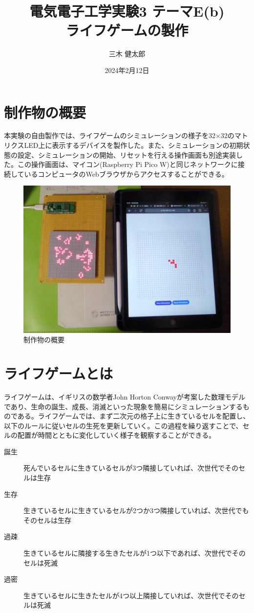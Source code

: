 \documentclass{jlreq}
\title{電気電子工学実験3 テーマE(b) \\ ライフゲームの製作}
\author{三木 健太郎}
\date{2024年2月12日}
\begin{document}
\maketitle

\section{制作物の概要}
本実験の自由製作では、ライフゲームのシミュレーションの様子を32×32のマトリクスLED上に表示するデバイスを製作した。また、シミュレーションの初期状態の設定、シミュレーションの開始、リセットを行える操作画面も別途実装した。この操作画面は、マイコン(Raspberry Pi Pico W)と同じネットワークに接続しているコンピュータのWebブラウザからアクセスすることができる。

\begin{figure}[h]
    \begin{center}
        \includegraphics[width=120mm]{img/life-game-indicator.jpg}
    \end{center}
    \caption{制作物の概要}
    \label{img:overall}
\end{figure}

\section{ライフゲームとは}
ライフゲームは、イギリスの数学者John Horton Conwayが考案した数理モデルであり、生命の誕生、成長、消滅といった現象を簡易にシミュレーションするものである。ライフゲームでは、まず二次元の格子上に生きているセルを配置し、以下のルールに従いセルの生死を更新していく。この過程を繰り返すことで、セルの配置が時間とともに変化していく様子を観察することができる。

\begin{description}
    \item[誕生] 死んでいるセルに生きているセルが3つ隣接していれば、次世代でそのセルは生存
    \item[生存] 生きているセルに生きているセルが2つか3つ隣接していれば、次世代でもそのセルは生存
    \item[過疎] 生きているセルに隣接する生きたセルが1つ以下であれば、次世代でそのセルは死滅
    \item[過密] 生きているセルに生きたセルが4つ以上隣接していれば、次世代でそのセルは死滅
\end{description}
\end{document}
